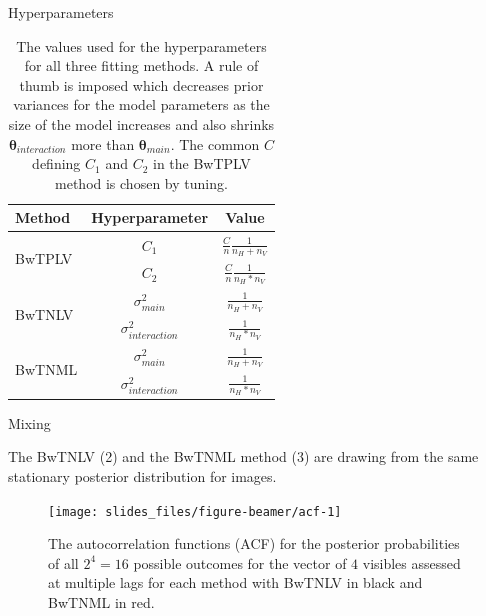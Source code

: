 \documentclass[ignorenonframetext,]{beamer}
\theoremstyle{definition}
\newcommand{\nv}{{n_{\scriptscriptstyle V}}}
\newcommand{\nh}{{n_{\scriptscriptstyle H}}}
\begin{document}
\begin{frame}{Hyperparameters}
\protect\hypertarget{hyperparameters}{}

\begin{table}[ht]
\centering
\caption{The values used for the hyperparameters for all three fitting methods. A rule of thumb is imposed which decreases prior variances for the model parameters as the size of the model increases and also shrinks $\boldsymbol \theta_{interaction}$ more than $\boldsymbol \theta_{main}$. The common $C$ defining $C_1$ and $C_2$  in the BwTPLV method is chosen by tuning.}
\label{tab:hyperparam}
\begin{tabular}{|l|c|c|}
\hline 
Method & Hyperparameter & Value \\ 
\hline \hline
\multirow{2}{*}{BwTPLV} & $C_1$ & $\frac{C}{n}\frac{1}{\nh + \nv}$ \\
 & $C_2$ & $\frac{C}{n}\frac{1}{\nh*\nv}$ \\
\hline
\multirow{2}{*}{BwTNLV} & $\sigma^2_{main}$ & $\frac{1}{\nh + \nv}$ \\
 & $\sigma^2_{interaction}$ & $\frac{1}{\nh*\nv}$ \\
\hline
\multirow{2}{*}{BwTNML} & $\sigma^2_{main}$ & $\frac{1}{\nh + \nv}$ \\
 & $\sigma^2_{interaction}$ & $\frac{1}{\nh*\nv}$ \\
\hline
\end{tabular}
\end{table}

\end{frame}

\begin{frame}{Mixing}
\protect\hypertarget{mixing}{}

The BwTNLV (2) and the BwTNML method (3) are drawing from the same
stationary posterior distribution for images.

\begin{figure}
\texttt{[image: slides\_files/figure-beamer/acf-1]} \caption{\label{fig:acf}The autocorrelation functions (ACF) for the posterior probabilities of all $2^4 = 16$ possible outcomes for the vector of $4$ visibles assessed at multiple lags for each method with BwTNLV in black and BwTNML in red.}\label{fig:acf}
\end{figure}

\end{frame}
\end{document}
